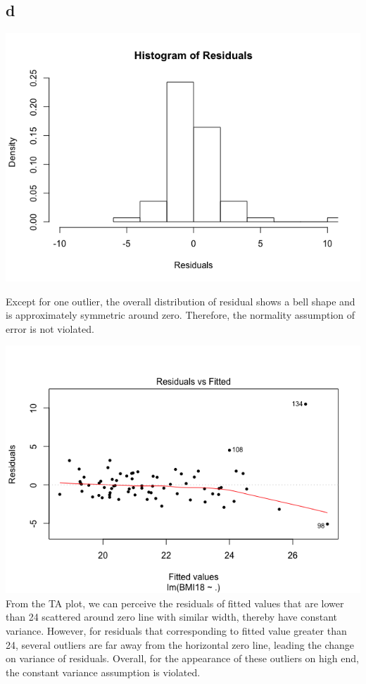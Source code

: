 \documentclass[11pt,letterpaper]{article}
\begin{document}
\subsection*{d}
\includegraphics[scale=0.7]{1-d-1.png}

\noindent Except for one outlier, the overall distribution of residual shows a bell shape and is approximately symmetric around zero. Therefore, the normality assumption of error is not violated. 

\includegraphics[scale=0.7]{1-d-2.png}
\noindent From the TA plot, we can perceive the residuals of fitted values that are lower than 24 scattered around zero line with similar width, thereby have constant variance. However, for residuals that corresponding to fitted value greater than 24, several outliers are far away from the horizontal zero line, leading the change on variance of residuals. Overall, for the appearance of these outliers on high end, the constant variance assumption is violated.
\end{document}
